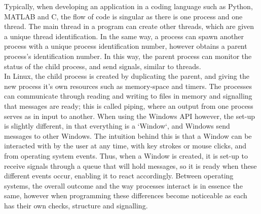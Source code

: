 \documentclass[12pt,openany,a4paper]{book}
\begin{document}
Typically, when developing an application in a coding language such as Python, MATLAB and C, the flow of code is singular as there is one process and one thread. The main thread in a program can create other threads, which are given a unique thread identification. In the same way, a process can spawn another process with a unique process identification number, however obtains a parent process's identification number. In this way, the parent process can monitor the status of the child process, and send signals, similar to threads. \\
In Linux, the child process is created by duplicating the parent, and giving the new process it's own resources such as memory-space and timers. The processes can communicate through reading and writing to files in memory and signalling that messages are ready; this is called piping, where an output from one process serves as in input to another. When using the Windows API however, the set-up is slightly different, in that everything is a `Window`, and Windows send messages to other Windows. The intuition behind this is that a Window can be interacted with by the user at any time, with key strokes or mouse clicks, and from operating system events. Thus, when a Window is created, it is set-up to receive signals through a queue that will hold messages, so it is ready when these different events occur, enabling it to react accordingly. Between operating systems, the overall outcome and the way processes interact is in essence the same, however when programming these differences become noticeable as each has their own checks, structure and signalling.\\
\end{document}
